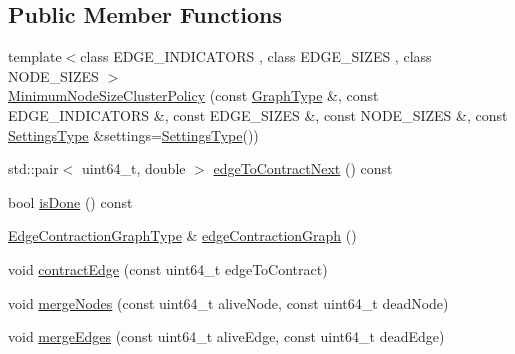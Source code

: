 \subsection*{Public Member Functions}
\begin{DoxyCompactItemize}
\item 
{\footnotesize template$<$class E\+D\+G\+E\+\_\+\+I\+N\+D\+I\+C\+A\+T\+O\+R\+S , class E\+D\+G\+E\+\_\+\+S\+I\+Z\+E\+S , class N\+O\+D\+E\+\_\+\+S\+I\+Z\+E\+S $>$ }\\\hyperlink{classnifty_1_1graph_1_1agglo_1_1MinimumNodeSizeClusterPolicy_a560b4f00ebeb74357401ba641fef6aea}{Minimum\+Node\+Size\+Cluster\+Policy} (const \hyperlink{classnifty_1_1graph_1_1agglo_1_1MinimumNodeSizeClusterPolicy_a6d81a64ca67c9feec052a031552282f0}{Graph\+Type} \&, const E\+D\+G\+E\+\_\+\+I\+N\+D\+I\+C\+A\+T\+O\+R\+S \&, const E\+D\+G\+E\+\_\+\+S\+I\+Z\+E\+S \&, const N\+O\+D\+E\+\_\+\+S\+I\+Z\+E\+S \&, const \hyperlink{structnifty_1_1graph_1_1agglo_1_1MinimumNodeSizeClusterPolicy_1_1SettingsType}{Settings\+Type} \&settings=\hyperlink{structnifty_1_1graph_1_1agglo_1_1MinimumNodeSizeClusterPolicy_1_1SettingsType}{Settings\+Type}())
\item 
std\+::pair$<$ uint64\+\_\+t, double $>$ \hyperlink{classnifty_1_1graph_1_1agglo_1_1MinimumNodeSizeClusterPolicy_aa0dedd8886682827b2ca0dd0605249f8}{edge\+To\+Contract\+Next} () const 
\item 
bool \hyperlink{classnifty_1_1graph_1_1agglo_1_1MinimumNodeSizeClusterPolicy_a778912b7bbaae44fd2fd5df495e109bd}{is\+Done} () const 
\item 
\hyperlink{classnifty_1_1graph_1_1agglo_1_1MinimumNodeSizeClusterPolicy_a5c67401c61d1d283b73c3ce8a31faeb9}{Edge\+Contraction\+Graph\+Type} \& \hyperlink{classnifty_1_1graph_1_1agglo_1_1MinimumNodeSizeClusterPolicy_aca43c3bece87aa733c25cef542006a42}{edge\+Contraction\+Graph} ()
\item 
void \hyperlink{classnifty_1_1graph_1_1agglo_1_1MinimumNodeSizeClusterPolicy_a04b27c347d3c6088d1555c1ea4aa429c}{contract\+Edge} (const uint64\+\_\+t edge\+To\+Contract)
\item 
void \hyperlink{classnifty_1_1graph_1_1agglo_1_1MinimumNodeSizeClusterPolicy_a4907559af0facc33614e00b53e46c146}{merge\+Nodes} (const uint64\+\_\+t alive\+Node, const uint64\+\_\+t dead\+Node)
\item 
void \hyperlink{classnifty_1_1graph_1_1agglo_1_1MinimumNodeSizeClusterPolicy_a5e98c7c5a86bbf435affcea45ea5e95f}{merge\+Edges} (const uint64\+\_\+t alive\+Edge, const uint64\+\_\+t dead\+Edge)
\item 

\end{DoxyCompactItemize}

